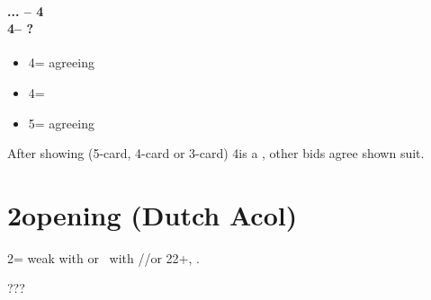 \documentclass[12pt, a4paper]{report}
\begin{document}
{    \subsubsection*{... -- 4\diams\\
                    4\hearts -- ?}
    \begin{itemize}
        \item 4\spades = agreeing \clubs
        \item 4\nt = \soff
        \item 5\clubs = agreeing \diams
    \end{itemize}

    \vspace{0.5cm}

    After showing \minor (5-card, 4-card or 3-card) 4\nt is a \soff, other bids
    agree shown suit.
}

\chapter*{\colorbox{Plum!30}{2\clubs opening (Dutch Acol)}}
 {

    2\clubs = weak with \diams or \gf\ with \clubs/\hearts/\spades or 22+, \bal.

    ???


}
\end{document}
